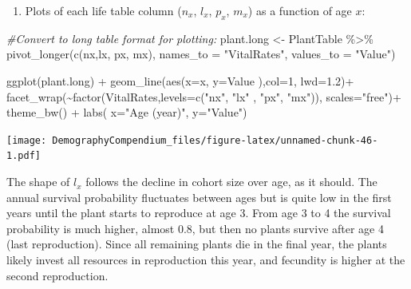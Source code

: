 \documentclass[
]{book}
\newenvironment{Shaded}{\begin{snugshade}}{\end{snugshade}}
\newcommand{\AttributeTok}[1]{\textcolor[rgb]{0.77,0.63,0.00}{#1}}
\newcommand{\CommentTok}[1]{\textcolor[rgb]{0.56,0.35,0.01}{\textit{#1}}}
\newcommand{\DecValTok}[1]{\textcolor[rgb]{0.00,0.00,0.81}{#1}}
\newcommand{\FloatTok}[1]{\textcolor[rgb]{0.00,0.00,0.81}{#1}}
\newcommand{\FunctionTok}[1]{\textcolor[rgb]{0.00,0.00,0.00}{#1}}
\newcommand{\NormalTok}[1]{#1}
\newcommand{\OtherTok}[1]{\textcolor[rgb]{0.56,0.35,0.01}{#1}}
\newcommand{\SpecialCharTok}[1]{\textcolor[rgb]{0.00,0.00,0.00}{#1}}
\newcommand{\StringTok}[1]{\textcolor[rgb]{0.31,0.60,0.02}{#1}}
\providecommand{\tightlist}{%
  \setlength{\itemsep}{0pt}\setlength{\parskip}{0pt}}
\begin{document}
\begin{enumerate}
\def\labelenumi{\arabic{enumi}.}
\setcounter{enumi}{3}
\tightlist
\item
  Plots of each life table column (\(n_x\), \(l_x\), \(p_x\), \(m_x\)) as a function of age \(x\):
\end{enumerate}

\begin{Shaded}
\begin{Highlighting}[]
\CommentTok{\#Convert to long table format for plotting:}
\NormalTok{plant.long }\OtherTok{\textless{}{-}}\NormalTok{ PlantTable }\SpecialCharTok{\%\textgreater{}\%} \FunctionTok{pivot\_longer}\NormalTok{(}\FunctionTok{c}\NormalTok{(nx,lx, px,  mx),}
               \AttributeTok{names\_to =} \StringTok{"VitalRates"}\NormalTok{, }\AttributeTok{values\_to =} \StringTok{"Value"}\NormalTok{)}
 
\FunctionTok{ggplot}\NormalTok{(plant.long) }\SpecialCharTok{+} 
  \FunctionTok{geom\_line}\NormalTok{(}\FunctionTok{aes}\NormalTok{(}\AttributeTok{x=}\NormalTok{x, }\AttributeTok{y=}\NormalTok{Value ),}\AttributeTok{col=}\DecValTok{1}\NormalTok{, }\AttributeTok{lwd=}\FloatTok{1.2}\NormalTok{)}\SpecialCharTok{+}
  \FunctionTok{facet\_wrap}\NormalTok{(}\SpecialCharTok{\textasciitilde{}}\FunctionTok{factor}\NormalTok{(VitalRates,}\AttributeTok{levels=}\FunctionTok{c}\NormalTok{(}\StringTok{"nx"}\NormalTok{, }\StringTok{"lx"}\NormalTok{ , }\StringTok{"px"}\NormalTok{, }\StringTok{"mx"}\NormalTok{)), }\AttributeTok{scales=}\StringTok{"free"}\NormalTok{)}\SpecialCharTok{+}
  \FunctionTok{theme\_bw}\NormalTok{() }\SpecialCharTok{+}
  \FunctionTok{labs}\NormalTok{( }\AttributeTok{x=}\StringTok{"Age (year)"}\NormalTok{, }\AttributeTok{y=}\StringTok{"Value"}\NormalTok{)}
\end{Highlighting}
\end{Shaded}

\texttt{[image: DemographyCompendium\_files/figure-latex/unnamed-chunk-46-1.pdf]}

The shape of \(l_x\) follows the decline in cohort size over age, as it should. The annual survival probability fluctuates between ages but is quite low in the first years until the plant starts to reproduce at age 3. From age 3 to 4 the survival probability is much higher, almost 0.8, but then no plants survive after age 4 (last reproduction). Since all remaining plants die in the final year, the plants likely invest all resources in reproduction this year, and fecundity is higher at the second reproduction.
\end{document}

